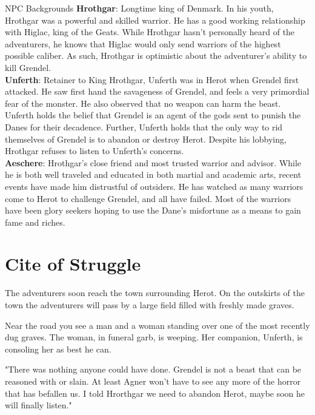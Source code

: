 \documentclass[10pt,twoside,twocolumn,openany]{book}
\begin{document}
\begin{commentbox}{NPC Backgrounds}
\textbf{Hrothgar}: Longtime king of Denmark. In his youth, Hrothgar was a powerful and skilled warrior. He has a good working relationship with Higlac, king of the Geats. While Hrothgar hasn't personally heard of the adventurers, he knows that Higlac would only send warriors of the highest possible caliber. As such, Hrothgar is optimistic about the adventurer's ability to kill Grendel.
\\
\textbf{Unferth}: Retainer to King Hrothgar, Unferth was in Herot when Grendel first attacked. He saw first hand the savageness of Grendel, and feels a very primordial fear of the monster. He also observed that no weapon can harm the beast. Unferth holds the belief that Grendel is an agent of the gods sent to punish the Danes for their decadence. Further, Unferth holds that the only way to rid themselves of Grendel is to abandon or destroy Herot. Despite his lobbying, Hrothgar refuses to listen to Unferth's concerns.
\\
\textbf{Aeschere}: Hrothgar's close friend and most trusted warrior and advisor. While he is both well traveled and educated in both martial and academic arts, recent events have made him distrustful of outsiders. He has watched as many warriors come to Herot to challenge Grendel, and all have failed. Most of the warriors have been glory seekers hoping to use the Dane's misfortune as a means to gain fame and riches.
\end{commentbox}

\section{Cite of Struggle}
The adventurers soon reach the town surrounding Herot. On the outskirts of the town the adventurers will pass by a large field filled with freshly made graves.

\begin{quotebox}
Near the road you see a man and a woman standing over one of the most recently dug graves. The woman, in funeral garb, is weeping. Her companion, Unferth, is consoling her as best he can.

"There was nothing anyone could have done. Grendel is not a beast that can be reasoned with or slain. At least Agner won't have to see any more of the horror that has befallen us. I told Hrorthgar we need to abandon Herot, maybe soon he will finally listen."
\end{quotebox}
\end{document}
